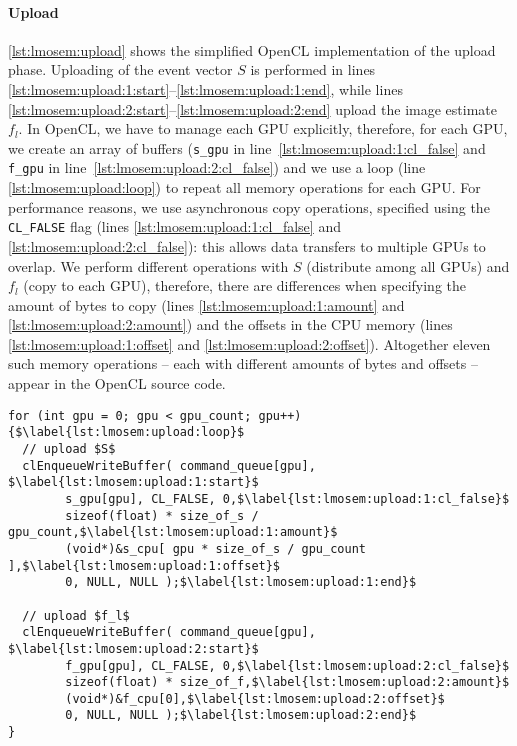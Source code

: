 \paragraph{Upload}
\autoref{lst:lmosem:upload} shows the simplified OpenCL implementation of the upload phase.
Uploading of the event vector $S$ is performed in lines \autoref{lst:lmosem:upload:1:start}--\autoref{lst:lmosem:upload:1:end}, while lines \autoref{lst:lmosem:upload:2:start}--\autoref{lst:lmosem:upload:2:end} upload the image estimate $f_l$.
In OpenCL, we have to manage each GPU explicitly, therefore, for each GPU, we create an array of buffers (\texttt{s\_gpu} in line~\autoref{lst:lmosem:upload:1:cl_false} and \texttt{f\_gpu} in line~\autoref{lst:lmosem:upload:2:cl_false}) and we use a loop (line \autoref{lst:lmosem:upload:loop}) to repeat all memory operations for each GPU.
For performance reasons, we use asynchronous copy operations, specified using the \texttt{CL\_FALSE} flag (lines \autoref{lst:lmosem:upload:1:cl_false} and \autoref{lst:lmosem:upload:2:cl_false}): this allows data transfers to multiple GPUs to overlap.
We perform different operations with $S$ (distribute among all GPUs) and $f_l$ (copy to each GPU), therefore, there are differences when specifying the amount of bytes to copy (lines \autoref{lst:lmosem:upload:1:amount} and \autoref{lst:lmosem:upload:2:amount}) and the offsets in the CPU memory (lines \autoref{lst:lmosem:upload:1:offset} and \autoref{lst:lmosem:upload:2:offset}).
Altogether eleven such memory operations -- each with different amounts of bytes and offsets -- appear in the OpenCL source code.

\begin{lstlisting}[float,
  caption={Implementation of the upload phase in OpenCL (omitting error checks for brevity)},
  label={lst:lmosem:upload}]
for (int gpu = 0; gpu < gpu_count; gpu++) {$\label{lst:lmosem:upload:loop}$
  // upload $S$
  clEnqueueWriteBuffer( command_queue[gpu], $\label{lst:lmosem:upload:1:start}$
        s_gpu[gpu], CL_FALSE, 0,$\label{lst:lmosem:upload:1:cl_false}$
        sizeof(float) * size_of_s / gpu_count,$\label{lst:lmosem:upload:1:amount}$
        (void*)&s_cpu[ gpu * size_of_s / gpu_count ],$\label{lst:lmosem:upload:1:offset}$
        0, NULL, NULL );$\label{lst:lmosem:upload:1:end}$

  // upload $f_l$
  clEnqueueWriteBuffer( command_queue[gpu], $\label{lst:lmosem:upload:2:start}$
        f_gpu[gpu], CL_FALSE, 0,$\label{lst:lmosem:upload:2:cl_false}$
        sizeof(float) * size_of_f,$\label{lst:lmosem:upload:2:amount}$
        (void*)&f_cpu[0],$\label{lst:lmosem:upload:2:offset}$
        0, NULL, NULL );$\label{lst:lmosem:upload:2:end}$
}
\end{lstlisting}

